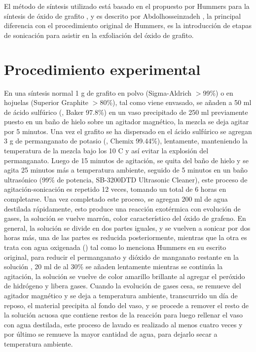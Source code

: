 El método de síntesis utilizado está basado en el propuesto por Hummers para la síntesis de óxido de grafito \citep{Hummers1958}, y es descrito por Abdolhosseinzadeh \citep{Abdolhosseinzadeh2015}, la principal diferencia con el procedimiento original de Hummers, es la introducción de etapas de sonicación para asistir en la exfoliación del óxido de grafito.

\section{Procedimiento experimental}
En una síntesis normal 1 g de grafito en polvo (Sigma-Aldrich $>$99\%) o en hojuelas (Superior Graphite $>$80\%), tal como viene envasado, se añaden a 50 ml de ácido sulfúrico (, Baker 97.8\%) en un vaso precipitado de 250 ml previamente puesto en un baño de hielo sobre un agitador magnético, la mezcla se deja agitar por 5 minutos. Una vez el grafito se ha dispersado en el ácido sulfúrico se agregan 3 g de permanganato de potasio (, Chemix 99.44\%), lentamente, manteniendo la temperatura de la mezcla bajo los 10 C y así evitar la explosión del permanganato. Luego de 15 minutos de agitación, se quita del baño de hielo y se agita 25 minutos más a temperatura ambiente, seguido de 5 minutos en un baño ultrasónico (99\% de potencia, SB-3200DTD Ultrasonic Cleaner), este proceso de agitación-sonicación es repetido 12 veces, tomando un total de 6 horas en completarse. Una vez completado este proceso, se agregan 200 ml de agua destilada rápidamente, esto produce una reacción exotérmica con evolución de gases, la solución se vuelve marrón, color característico del óxido de grafeno. En general, la solución se divide en dos partes iguales, y se vuelven a sonicar por dos horas más, una de las partes es reducida posteriormente, mientras que la otra es trata con agua oxigenada () tal como lo menciona Hummers en su escrito original, para reducir el permanganato y dióxido de manganato restante en la solución \citep{Hummers1958}, 20 ml de  al 30\% se añaden lentamente mientras se continúa la  agitación, la solución se vuelve de color amarillo brillante al agregar el peróxido de hidrógeno y libera gases. Cuando la evolución de gases cesa, se remueve del agitador magnético y se deja a temperatura ambiente, transcurrido un día de reposo, el material precipita al fondo del vaso, y se procede a remover el resto de la solución acuosa que contiene restos de la reacción para luego rellenar el vaso con agua destilada, este proceso de lavado es realizado al menos cuatro veces y por último se remueve la mayor cantidad de agua, para dejarlo secar a temperatura ambiente.

